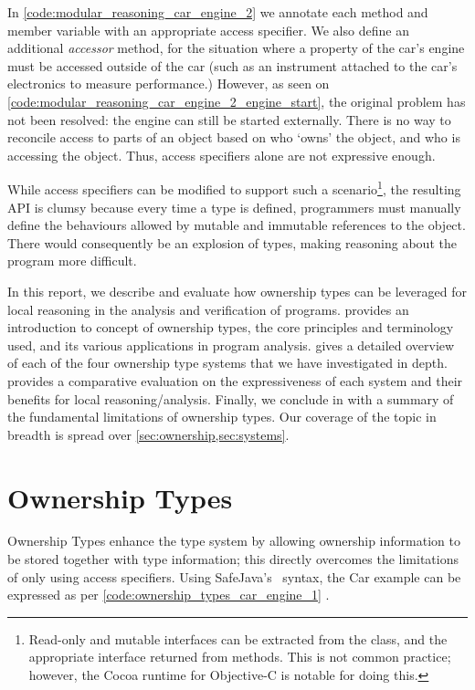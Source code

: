 \documentclass{acm_proc_article-sp}
\begin{document}
In \cref{code:modular_reasoning_car_engine_2} we annotate each method
and member variable with an appropriate access specifier. We also define an
additional \emph{accessor} method, for the situation where a property of the
car's engine must be accessed outside of the car (such as an instrument 
attached to the car's electronics to measure performance.) However, as seen on
\cref{code:modular_reasoning_car_engine_2_engine_start}, the original
problem has not been resolved: the engine can still be started externally.
There is no way to reconcile access to parts of an object based on who `owns'
the object, and who is accessing the object. Thus, access specifiers alone are
not expressive enough.

While access specifiers can be modified to support such a
scenario\footnote{Read-only and mutable interfaces can be extracted from the
class, and the appropriate interface returned from methods. This is not common
practice; however, the Cocoa runtime for Objective-C is notable for doing
this.}, the resulting API is clumsy because every time a type is defined,
programmers must manually define the behaviours allowed by mutable and
immutable references to the object. There would consequently be an explosion of
types, making reasoning about the program more difficult.

In this report, we describe and evaluate how ownership types can be leveraged
for local reasoning in the analysis and verification of programs.
 provides an introduction to concept of ownership types,
the core principles and terminology used, and its various applications in
program analysis.  gives a detailed overview of each of the
four ownership type systems that we have investigated in depth. 
provides a comparative evaluation on the expressiveness of each system and
their benefits for local reasoning/analysis. Finally, we conclude in
 with a summary of the fundamental limitations of
ownership types. Our coverage of the topic in breadth is spread over
\cref{sec:ownership,sec:systems}.


\section{Ownership Types}
\label{sec:ownership}

Ownership Types enhance the type system by allowing ownership information to be 
stored together with type information; this directly overcomes the limitations 
of only using access specifiers. Using SafeJava's~\cite{boyapati04safejava} 
syntax, the Car example can be expressed as per 
\cref{code:ownership_types_car_engine_1} 
.
\end{document}
